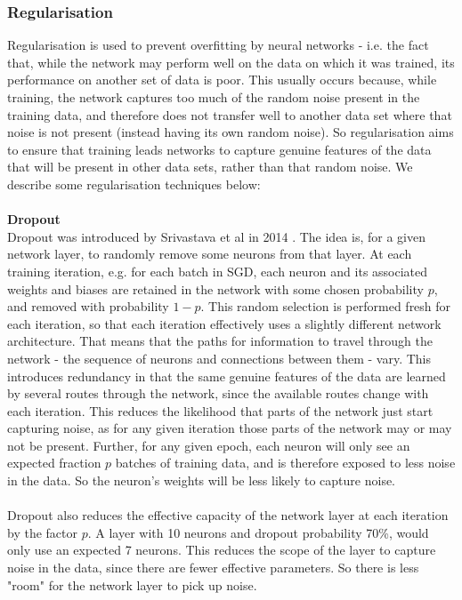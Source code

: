 \documentclass[11pt]{article} %
\theoremstyle{plain}
\theoremstyle{definition}
\begin{document}
\subsubsection{Regularisation}
Regularisation is used to prevent overfitting by neural networks - i.e. the fact that, while the network may perform well on the data on which it was trained, its performance on another set of data is poor. This usually occurs because, while training, the network captures too much of the random noise present in the training data, and therefore does not transfer well to another data set where that noise is not present (instead having its own random noise). So regularisation aims to ensure that training leads networks to capture genuine features of the data that will be present in other data sets, rather than that random noise. We describe some regularisation techniques below: 
\\
\\
\noindent
\textbf{Dropout}
\\
\noindent
Dropout was introduced by Srivastava et al in 2014 \cite{dropout_paper}. The idea is, for a given network layer, to randomly remove some neurons from that layer. At each training iteration, e.g. for each batch in SGD, each neuron and its associated weights and biases are retained in the network with some chosen probability \(p\), and removed with probability \(1-p\). This random selection is performed fresh for each iteration, so that each iteration effectively uses a slightly different network architecture. That means that the paths for information to travel through the network - the sequence of neurons and connections between them - vary. This introduces redundancy in that the same genuine features of the data are learned by several routes through the network, since the available routes change with each iteration. This reduces the likelihood that parts of the network just start capturing noise, as for any given iteration those parts of the network may or may not be present. Further, for any given epoch, each neuron will only see an expected fraction \(p\) batches of training data, and is therefore exposed to less noise in the data. So the neuron's weights will be less likely to capture noise.        
\\
\\
\noindent
Dropout also reduces the effective capacity of the network layer at each iteration by the factor \(p\). A layer with 10 neurons and dropout probability 70\%, would only use an expected 7 neurons. This reduces the scope of the layer to capture noise in the data, since there are fewer effective parameters. So there is less "room" for the network layer to pick up noise.
\end{document}
